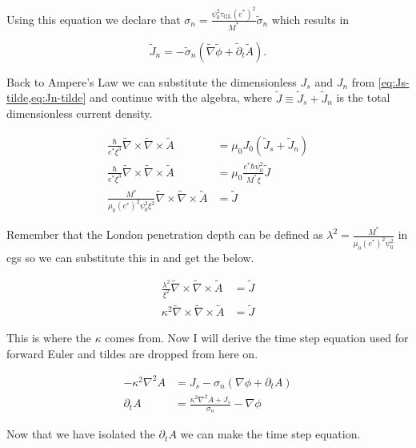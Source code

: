 \documentclass[11pt]{article}
\theoremstyle{definition}
\begin{document}
Using this equation we declare that $\sigma_n = \frac{\psi_0^2 \tau_{\mathrm{GL}}(e^*)^2}{M^*}
\tilde{\sigma}_n$ which results in

\begin{equation}
\label{eq:Jn-tilde}
\tilde{J}_n = - \tilde{\sigma}_n (\tilde{\nabla} \tilde{\phi} + \tilde{\partial}_t \tilde{A}).
\end{equation}

Back to Ampere's Law we can substitute the dimensionless $J_s$ and $J_n$ from \cref{eq:Js-tilde,eq:Jn-tilde} and continue with the algebra, where $\tilde{J} \equiv \tilde{J}_s + \tilde{J}_n$ is the total dimensionless current density.

\begin{align}
\frac{\hbar}{e^* \xi^3} \tilde{\nabla} \times \tilde{\nabla} \times \tilde{A} &= \mu_0 J_0 (\tilde{J}_s + \tilde{J}_n) \label{eq:ampere-sub-1}\\
\frac{\hbar}{e^* \xi^3} \tilde{\nabla} \times \tilde{\nabla} \times \tilde{A} &= \mu_0 \frac{e^* \hbar \psi_0^2}{M^* \xi} \tilde{J} \label{eq:ampere-sub-2}\\
\frac{M^*}{\mu_0 (e^*)^2 \psi_0^2 \xi^2} \tilde{\nabla} \times \tilde{\nabla} \times \tilde{A} &= \tilde{J} \label{eq:ampere-sub-3}
\end{align}

Remember that the London penetration depth can be defined as $\lambda^2 = \frac{M^*}{\mu_0 (e^*)^2 \psi_0^2}$ in cgs so we can substitute this in and get the below.

\begin{align}
\frac{\lambda^2}{\xi^2} \tilde{\nabla} \times \tilde{\nabla} \times \tilde{A} &= \tilde{J} \label{eq:kappa-1}\\
\kappa^2 \tilde{\nabla} \times \tilde{\nabla} \times \tilde{A} &= \tilde{J} \label{eq:kappa-result}
\end{align}

This is where the $\kappa$ comes from. Now I will derive the time step equation used for forward Euler and tildes are dropped from here on.

\begin{align}
-\kappa^2 \nabla^2 A &= J_s - \sigma_n (\nabla \phi + \partial_t A) \label{eq:dtA-1}\\
\partial_t A &= \frac{\kappa^2 \nabla^2 A + J_s}{\sigma_n} - \nabla \phi \label{eq:dtA-2}
\end{align}

Now that we have isolated the $\partial_t A$ we can make the time step equation.
\end{document}
